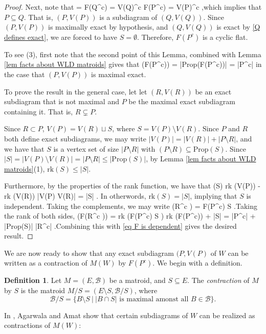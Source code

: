 \documentclass[11pt]{article}
\newcommand{\rk}{\textrm{rk} }
\def\bas #1\eas{\begin{align*} #1 \end{align*}}
\newcommand{\cB}{\mathcal{B}}
\newcommand{\Prop}{\textrm{Prop}}
\theoremstyle{remark}
\theoremstyle{definition}
\newtheorem{dfn}[thm]{Definition}
\begin{document}
\begin{proof}
Next, note that \bas C = F(Q^c) = V(Q)^c \subseteq F(P^c) = V(P)^c \;,\eas which implies that $P \subseteq Q$. That is, $(P, V(P))$ is a subdiagram of $(Q, V(Q))$. Since $(P, V(P))$ is maximally exact by hypothesis, and $(Q, V(Q))$ is exact by \eqref{Q defines exact}, we are forced to have $S = \emptyset$. Therefore, $F(P^c)$ is a cyclic flat.

To see (3), first note that the second point of this Lemma, combined with Lemma \ref{lem facts about WLD matroids} gives that
\bas\rk(F(P^c)) = |\Prop(F(P^c))| = |P^c|\eas
in the case that $(P, V(P))$ is maximal exact.

To prove the result in the general case, let let $(R,V(R))$ be an exact subdiagram that is not maximal and $P$ be the maximal exact subdiagram containing it. That is, $R \subsetneq P$.

Since $R \subset P$, $V(P) = V(R) \sqcup S$, where $S = V(P) \setminus V(R)$. Since $P$ and $R$ both define exact subdiagrams, we may write $|V(P)| = |V(R)| + |P \setminus R|$, and we have that $S$ is a vertex set of size $|P \setminus R|$ with $(P \setminus R) \subseteq \Prop(S)$. Since  $|S| = |V(P) \setminus V(R)| = |P \setminus R| \leq |\Prop(S) |$, by Lemma \ref{lem facts about WLD matroids}(1), $\rk(S) \leq |S|$. 

Furthermore, by the properties of the rank function, we have that \bas \rk(S) \geq \rk(V(P)) - \rk(V(R)) \geq |V(P) \setminus V(R)| = |S| \; . \eas In otherwords, $\rk(S) = |S|$, implying that $S$ is independent. Taking the complements, we may write \bas F(R^c ) = F(P^c) \sqcup S \;.\eas Taking the rank of both sides, \bas \rk(F(R^c )) = \rk(F(P^c) \sqcup S ) \leq \rk(F(P^c)) + |S| = |P^c| + |\Prop(S)| \leq |R^c| \;.\eas Combining this with \eqref{eq F is dependent} gives the desired result.

\end{proof}

We are now ready to show that any exact subdiagram $(P, V(P)$ of $W$ can be written as a contraction of $M(W)$ by $F(P^c)$. We begin with a definition.

\begin{dfn}\label{matroid contraction}
Let $M = (E,\cB)$ be a matroid, and $S \subseteq E$. The {\em contraction} of $M$ by $S$ is the matroid $M/S = (E \setminus S, \cB / S)$, where
\[\cB / S = \{B \setminus S \ \big| \ |B\cap S | \text{ is maximal amonst all }B \in \cB\}.\]
\end{dfn}

In \cite{wilsonloop}, Agarwala and Amat show that certain subdiagrams of $W$ can be realized as contractions of $M(W)$:
\end{document}

